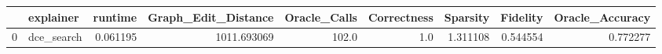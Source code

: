 \begin{tabular}{llrrrrrrr}
\toprule
{} &   explainer &   runtime &  Graph\_Edit\_Distance &  Oracle\_Calls &  Correctness &  Sparsity &  Fidelity &  Oracle\_Accuracy \\
\midrule
0 &  dce\_search &  0.061195 &          1011.693069 &         102.0 &          1.0 &  1.311108 &  0.544554 &         0.772277 \\
\bottomrule
\end{tabular}
